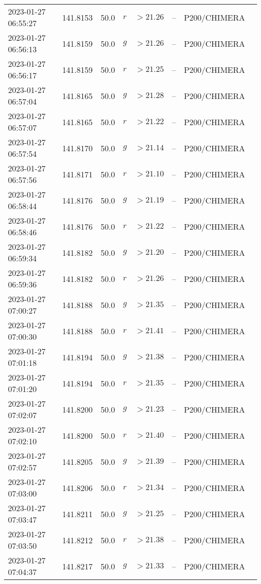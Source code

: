 \documentclass{nature_plusfigure}
\begin{document}
\begin{supplement}
\begin{center}
\begin{longtable}{llllllll}
2023-01-27 06:55:27 & 141.8153 & 50.0 & $r$ & $>21.26$ & -- & P200/CHIMERA &  \\ 
2023-01-27 06:56:13 & 141.8159 & 50.0 & $g$ & $>21.26$ & -- & P200/CHIMERA &  \\ 
2023-01-27 06:56:17 & 141.8159 & 50.0 & $r$ & $>21.25$ & -- & P200/CHIMERA &  \\ 
2023-01-27 06:57:04 & 141.8165 & 50.0 & $g$ & $>21.28$ & -- & P200/CHIMERA &  \\ 
2023-01-27 06:57:07 & 141.8165 & 50.0 & $r$ & $>21.22$ & -- & P200/CHIMERA &  \\ 
2023-01-27 06:57:54 & 141.8170 & 50.0 & $g$ & $>21.14$ & -- & P200/CHIMERA &  \\ 
2023-01-27 06:57:56 & 141.8171 & 50.0 & $r$ & $>21.10$ & -- & P200/CHIMERA &  \\ 
2023-01-27 06:58:44 & 141.8176 & 50.0 & $g$ & $>21.19$ & -- & P200/CHIMERA &  \\ 
2023-01-27 06:58:46 & 141.8176 & 50.0 & $r$ & $>21.22$ & -- & P200/CHIMERA &  \\ 
2023-01-27 06:59:34 & 141.8182 & 50.0 & $g$ & $>21.20$ & -- & P200/CHIMERA &  \\ 
2023-01-27 06:59:36 & 141.8182 & 50.0 & $r$ & $>21.26$ & -- & P200/CHIMERA &  \\ 
2023-01-27 07:00:27 & 141.8188 & 50.0 & $g$ & $>21.35$ & -- & P200/CHIMERA &  \\ 
2023-01-27 07:00:30 & 141.8188 & 50.0 & $r$ & $>21.41$ & -- & P200/CHIMERA &  \\ 
2023-01-27 07:01:18 & 141.8194 & 50.0 & $g$ & $>21.38$ & -- & P200/CHIMERA &  \\ 
2023-01-27 07:01:20 & 141.8194 & 50.0 & $r$ & $>21.35$ & -- & P200/CHIMERA &  \\ 
2023-01-27 07:02:07 & 141.8200 & 50.0 & $g$ & $>21.23$ & -- & P200/CHIMERA &  \\ 
2023-01-27 07:02:10 & 141.8200 & 50.0 & $r$ & $>21.40$ & -- & P200/CHIMERA &  \\ 
2023-01-27 07:02:57 & 141.8205 & 50.0 & $g$ & $>21.39$ & -- & P200/CHIMERA &  \\ 
2023-01-27 07:03:00 & 141.8206 & 50.0 & $r$ & $>21.34$ & -- & P200/CHIMERA &  \\ 
2023-01-27 07:03:47 & 141.8211 & 50.0 & $g$ & $>21.25$ & -- & P200/CHIMERA &  \\ 
2023-01-27 07:03:50 & 141.8212 & 50.0 & $r$ & $>21.38$ & -- & P200/CHIMERA &  \\ 
2023-01-27 07:04:37 & 141.8217 & 50.0 & $g$ & $>21.33$ & -- & P200/CHIMERA &  \\ 

\end{longtable}
\end{center}
\end{supplement}
\end{document}

